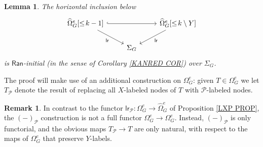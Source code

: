 \documentclass[a4paper,10pt
,draft
]{article}%
\numberwithin{equation}{section}
\numberwithin{figure}{section}
\newtheorem{lemma}[equation]{Lemma}%
\theoremstyle{definition} %
\newtheorem{remark}[equation]{Remark}%
\newcommand{\1}{\ensuremath{\mathbbm 1}}%
\begin{document}
\begin{lemma}\label{MINUS_LAN_FINAL_LEMMA}
% 
The horizontal inclusion below 
\[
\begin{tikzcd}
	\widehat{\Omega}_G^e[\leq\! k-1]
	\arrow{dr}[swap]{\mathsf{lr}} \arrow[rr, hookrightarrow] &&
	\widehat{\Omega}_G^{e}[\leq\! k \mathbin{\backslash} Y] \arrow{dl}{\mathsf{lr}}
\\
	&
	\Sigma_G
\end{tikzcd}
\]  
is $\mathsf{Ran}$-initial (in the sense of Corollary \ref{KANRED COR})
over $\Sigma_G$.  
\end{lemma}

The proof will make use of an additional construction on 
$\Omega_{G}^e$: 
given $T \in \Omega_{G}^e$ we let $T_{\mathcal{P}}$ denote the result of replacing all $X$-labeled nodes of $T$ with $\mathcal{P}$-labeled nodes.

\begin{remark}\label{YINERT REM}
	In contrast to the functor
	$\mathsf{lr}_{\mathcal{P}} \colon
	\Omega_G^e \to \widehat{\Omega}_G^e $
	of Proposition \ref{LXP PROP},
	the $(\minus)_{\mathcal{P}}$ construction 
	is not a full functor
	$\Omega_G^e \to \Omega_G^e$.
	Instead, $(\minus)_{\mathcal{P}}$ is only functorial, and the obvious maps $T_{\mathcal{P}} \to T$ are only natural,
	with respect to the
	maps of $\Omega_G^e$ that preserve $Y$-labels.
\end{remark}
\end{document}
